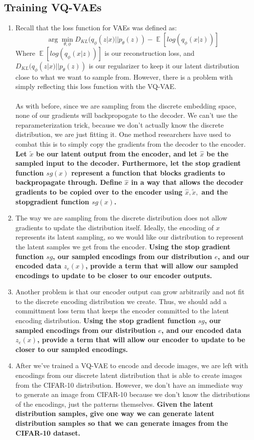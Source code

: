 \documentclass{article}
\DeclareMathOperator{\EX}{\mathbb{E}}%
\begin{document}
\subsection{Training VQ-VAEs}
\begin{enumerate}
    \item Recall that the loss function for VAEs was defined as:
$$\arg\min_{\theta, \phi} D_{KL}(q_{\phi}(z|x) || p_{\theta}(z)) - \EX[log(q_{\phi}(x|z))]$$
Where $\EX[log(q_{\phi}(x|z))]$ is our reconstruction loss, and $D_{KL}(q_{\phi}(z|x) || p_{\theta}(z))$ is our regularizer to keep it our latent distribution close to what we want to sample from. However, there is a problem with simply reflecting this loss function with the VQ-VAE.
\\
\\
As with before, since we are sampling from the discrete embedding space, none of our gradients will backpropogate to the decoder. We can't use the reparameterization trick, because we don't actually know the discrete distribution, we are just fitting it. One method researchers have used to combat this is to simply copy the gradients from the decoder to the encoder. \textbf{Let $\tilde{x}$ be our latent output from the encoder, and let $\hat{x}$ be the sampled input to the decoder. Furthermore, let the stop gradient function $sg(x)$ represent a function that blocks gradients to backpropagate through. Define $\hat{x}$ in a way that allows the decoder gradients to be copied over to the encoder using $\hat{x}, \tilde{x}, $ and the stopgradient function $sg(x)$.}

\item The way we are sampling from the discrete distribution does not allow gradients to update the distribution itself. Ideally, the encoding of $x$ represents its latent sampling, so we would like our distribution to represent the latent samples we get from the encoder. \textbf{Using the stop gradient function $sg$, our sampled encodings from our distribution $e$, and our encoded data $z_e(x)$, provide a term that will allow our sampled encodings to update to be closer to our encoder outputs.}

\item Another problem is that our encoder output can grow arbitrarily and not fit to the discrete encoding distribution we create. Thus, we should add a committment loss term that keeps the encoder committed to the latent encoding distribution. \textbf{Using the stop gradient function $sg$, our sampled encodings from our distribution $e$, and our encoded data $z_e(x)$, provide a term that will allow our encoder to update to be closer to our sampled encodings.}

\item After we've trained a VQ-VAE to encode and decode images, we are left with encodings from our discrete latent distribution that is able to create images from the CIFAR-10 distribution. However, we don't have an immediate way to generate an image from CIFAR-10 because we don't know the distributions of the encodings, just the patterns themselves. \textbf{Given the latent distribution samples, give one way we can generate latent distribution samples so that we can generate images from the CIFAR-10 dataset.}
\end{enumerate}
\end{document}
